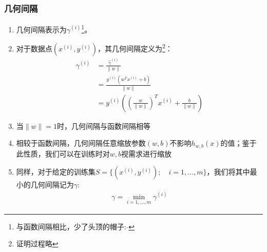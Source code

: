 \subsubsection{几何间隔}
\begin{enumerate}
	\item 几何间隔表示为$\gamma^{(i)}$\footnote{与函数间隔相比，少了头顶的帽子: $\hat{ }$}。
	\item 对于数据点$(x^{(i)}, y^{(i)})$，其几何间隔定义为\footnote{证明过程略}：
	\begin{align}
		\gamma^{(i)} &= \frac{\hat{\gamma}^{(i)}}{\|w\|}  \\
		&= \frac{y^{(i)}(w^Tx^{(i)} + b)}{\|w\|}  \\
		&=  y^{(i)} \left(\left(\frac{w}{\|w\|}\right)^T x^{(i)} + \frac{b}{\|w\|}\right)
	\end{align}
	\item 当$\|w\|=1$时，几何间隔与函数间隔相等
	\item 相较于函数间隔，几何间隔任意缩放参数$(w,b)$不影响$h_{w,b}(x)$的值；鉴于此性质，我们可以在训练时对$w, b$视需求进行缩放
	\item 同样，对于给定的训练集$S=\{(x^{(i)}, y^{(i)}); \quad i = 1, \dots, m\}$，我们将其中最小的几何间隔记为$\gamma$:
	\begin{align}
		\gamma = \min_{i=1,\dots,m}\gamma^{(i)}
	\end{align}
\end{enumerate}
























